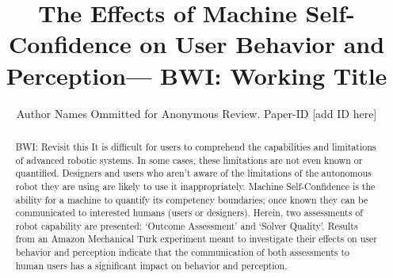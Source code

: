 \documentclass[conference,10pt]{IEEEtran}
\newcommand{\hlb}[1]{{\color{blue} #1}}
\newcommand{\brett}[1]{\hlb{BWI: #1}}
\begin{document}
\title{The Effects of Machine Self-Confidence on User Behavior and Perception---\brett{Working Title}}
\author{Author Names Ommitted for Anonymous Review. Paper-ID [add ID here]} 

\maketitle

\begin{abstract}
    \brett{Revisit this}
    It is difficult for users to comprehend the capabilities and limitations of advanced robotic systems. In some cases, these limitations are not even known or quantified. Designers and users who aren't aware of the limitations of the autonomous robot they are using are likely to use it inappropriately. Machine Self-Confidence is the ability for a machine to quantify its competency boundaries; once known they can be communicated to interested humans (users or designers). Herein, two assessments of robot capability are presented: `Outcome Assessment' and `Solver Quality'. Results from an Amazon Mechanical Turk experiment meant to investigate their effects on user behavior and perception indicate that the communication of both assessments to human users has a significant impact on behavior and perception.
\end{abstract}

\IEEEpeerreviewmaketitle










\appendices

\end{document}
